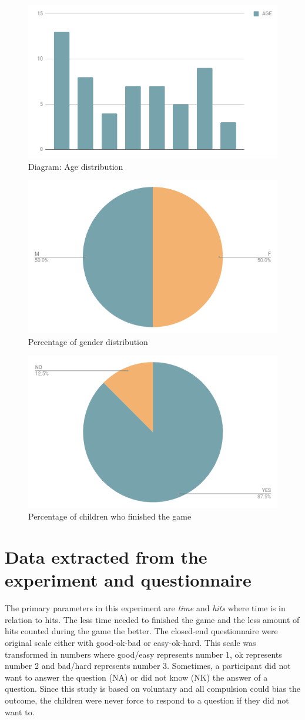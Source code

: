 \begin{figure}[!ht]
    \centering
    \includegraphics[width=.6\textwidth]{figures/agedistribution.png}
    \caption{Diagram: Age distribution}
    \label{fig:agedistribution}
\end{figure}
\begin{figure}[!ht]
    \centering
    \includegraphics[width=.4\textwidth]{figures/genderdistribution.png}
    \caption{Percentage of gender distribution}
    \label{fig:genderdistribution}
\end{figure}
\begin{figure}[!ht]
    \centering
    \includegraphics[width=.4\textwidth]{figures/finishedgame.png}
    \caption{Percentage of children who finished the game}
    \label{fig:finishedgame}
\end{figure}

\newpage


\section{Data extracted from the experiment and questionnaire}
The primary parameters in this experiment are \textit{time} and \textit{hits} where time is in relation to hits. The less time needed to finished the game and the less amount of hits counted during the game the better.
The closed-end questionnaire were original scale either with good-ok-bad or easy-ok-hard. This scale was transformed in numbers where good/easy represents number 1, ok represents number 2 and bad/hard represents number 3.
Sometimes, a participant did not want to answer the question (NA) or did not know (NK) the answer of a question. Since this study is based on voluntary and all compulsion could bias the outcome, the children were never force to respond to a question if they did not want to.

